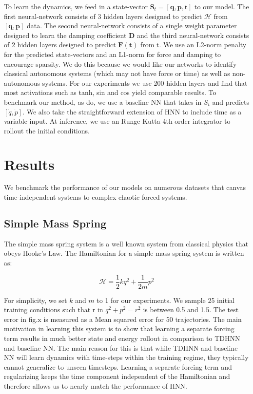 \documentclass[twoside]{article}
\begin{document}
To learn the dynamics, we feed in a state-vector $\mathbf{S}_t = [\mathbf{q},\mathbf{p},\mathbf{t}]$ to our model. The first neural-network consists of 3 hidden layers designed to predict $\mathcal{H}$ from $[\mathbf{q},\mathbf{p}]$ data. The second neural-network consists of a single weight parameter designed to learn the damping coefficient $\mathbf{D}$ and the third neural-network consists of 2 hidden layers designed to predict $\mathbf{F(t)}$ from t. We use an L2-norm penalty for the predicted state-vectors and an L1-norm for force and damping to encourage sparsity. We do this because we would like our networks to identify classical autonomous systems (which may not have force or time) as well as non-autonomous systems. For our experiments we use 200 hidden layers and find that most activations such as tanh, sin and cos yield comparable results. To benchmark our method, as \cite{greydanus} do, we use a baseline NN that takes in $S_t$ and predicts $[\dot{q},\dot{p}]$. We also take the straightforward extension of HNN to include time as a variable input. At inference, we use an Runge-Kutta 4th order integrator to rollout the initial conditions. 

\section{Results}

We benchmark the performance of our models on numerous datasets that canvas time-independent systems to complex chaotic forced systems.

\subsection{Simple Mass Spring}

The simple mass spring system is a well known system from classical physics that obeys Hooke's Law. The Hamiltonian for a simple mass spring system is written as:

\begin{equation}
\mathcal{H} = \frac{1}{2}kq^2 + \frac{1}{2m}p^2 
\end{equation}

For simplicity, we set $k$ and $m$ to 1 for our experiments. We sample 25 initial training conditions such that r in $q^2+p^2 = r^2$ is between 0.5 and 1.5.  The test error in fig.x is measured as a Mean squared error for 50 trajectories. The main motivation in learning this system is to show that learning a separate forcing term results in much better state and energy rollout in comparison to TDHNN and baseline NN. The main reason for this is that while TDHNN and baseline NN will learn dynamics with time-steps within the training regime, they typically cannot generalize to unseen timesteps. Learning a separate forcing term and regularizing keeps the time component independent of the Hamiltonian and therefore allows us to nearly match the performance of HNN.
\end{document}
